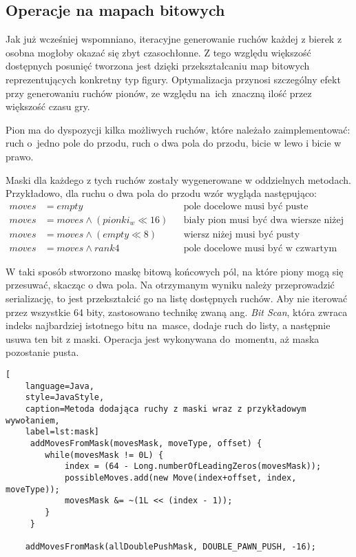 \subsection{Operacje na mapach bitowych}
\label{subsec:operacje-na-mapach-bitowych}

Jak już wcześniej wspomniano, iteracyjne generowanie ruchów każdej z bierek z osobna mogłoby okazać się zbyt czasochłonne.
Z tego względu większość dostępnych posunięć tworzona jest dzięki przekształcaniu map bitowych reprezentujących konkretny typ figury.
Optymalizacja przynosi szczególny efekt przy generowaniu ruchów pionów, ze względu na~ich~znaczną ilość przez większość czasu gry.

Pion ma do dyspozycji kilka możliwych ruchów, które należało zaimplementować: ruch o~jedno pole do przodu, ruch o dwa pola do przodu, bicie w lewo i bicie w prawo.

Maski dla każdego z tych ruchów zostały wygenerowane w oddzielnych metodach.
Przykładowo, dla ruchu o dwa pola do przodu wzór wygląda następująco:
\begin{align*}
    moves & = empty && \text{pole docelowe musi być puste} \\
    moves & = moves \wedge (pionki_w\ll16) && \text{biały pion musi być dwa wiersze niżej}\\
    moves & = moves \wedge (empty\ll8) && \text{wiersz niżej musi być pusty}\\
    moves & = moves \wedge rank4 && \text{pole docelowe musi być w czwartym wierszu}
\end{align*}

W taki sposób stworzono maskę bitową końcowych pól, na które piony mogą się przesuwać, skacząc o dwa pola.
Na otrzymanym wyniku należy przeprowadzić serializację, to jest przekształcić go na listę dostępnych ruchów.
Aby nie iterować przez wszystkie 64 bity, zastosowano technikę zwaną ang. \emph{Bit Scan}, która zwraca indeks najbardziej istotnego bitu na~masce, dodaje ruch do listy, a następnie usuwa ten bit z maski.
Operacja jest wykonywana do~momentu, aż maska pozostanie pusta.
\begin{lstlisting}[
    language=Java,
    style=JavaStyle,
    caption=Metoda dodająca ruchy z maski wraz z przykładowym wywołaniem,
    label=lst:mask]
     addMovesFromMask(movesMask, moveType, offset) {
        while(movesMask != 0L) {
            index = (64 - Long.numberOfLeadingZeros(movesMask));
            possibleMoves.add(new Move(index+offset, index, moveType));
            movesMask &= ~(1L << (index - 1));
        }
     }

    addMovesFromMask(allDoublePushMask, DOUBLE_PAWN_PUSH, -16);

\end{lstlisting}

